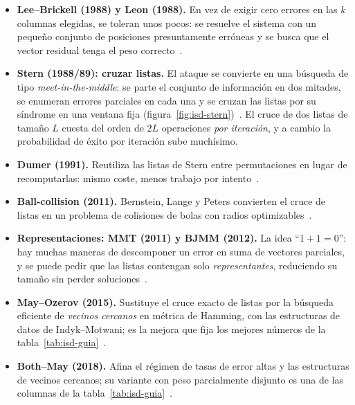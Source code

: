 \begin{itemize}[leftmargin=1.5em,itemsep=3pt]
  \item \textbf{Lee--Brickell (1988) y Leon (1988).}
        En vez de exigir cero errores en las $k$ columnas elegidas,
        se toleran unos pocos: se resuelve el sistema con un pequeño
        conjunto de posiciones presuntamente erróneas y se busca que
        el vector residual tenga el peso correcto~\cite{lee1988,leon1988}.
  \item \textbf{Stern (1988/89): cruzar listas.} El ataque se
        convierte en una búsqueda de tipo \emph{meet-in-the-middle}:
        se parte el conjunto de información en dos mitades, se
        enumeran errores parciales en cada una y se cruzan las listas
        por su síndrome en una ventana fija
        (figura~\ref{fig:isd-stern})~\cite{stern1989}. El cruce de
        dos listas de tamaño $L$ cuesta del orden de $2L$
        operaciones \emph{por iteración}, y a cambio la probabilidad de
        éxito por iteración sube muchísimo.
  \item \textbf{Dumer (1991).} Reutiliza las listas de Stern entre
        permutaciones en lugar de recomputarlas: mismo coste, menos
        trabajo por intento~\cite{dumer1991}.
  \item \textbf{Ball-collision (2011).} Bernstein, Lange y Peters
        convierten el cruce de listas en un problema de colisiones
        de bolas con radios optimizables~\cite{blp2011}.
  \item \textbf{Representaciones: MMT (2011) y BJMM (2012).} La
        idea ``$1+1=0$'': hay muchas maneras de descomponer un error
        en suma de vectores parciales, y se puede pedir que las
        listas contengan solo \emph{representantes}, reduciendo su
        tamaño sin perder soluciones~\cite{mmt2011,bjmm2012}.
  \item \textbf{May--Ozerov (2015).} Sustituye el cruce exacto de
        listas por la búsqueda eficiente de \emph{vecinos cercanos}
        en métrica de Hamming, con las estructuras de datos de
        Indyk--Motwani; es la mejora que fija los mejores números de
        la tabla~\ref{tab:isd-guia}~\cite{mo2015}.
  \item \textbf{Both--May (2018).} Afina el régimen de tasas de
        error altas y las estructuras de vecinos cercanos; su
        variante con peso parcialmente disjunto es una de las
        columnas de la tabla~\ref{tab:isd-guia}~\cite{bothmay2018}.
\end{itemize}


